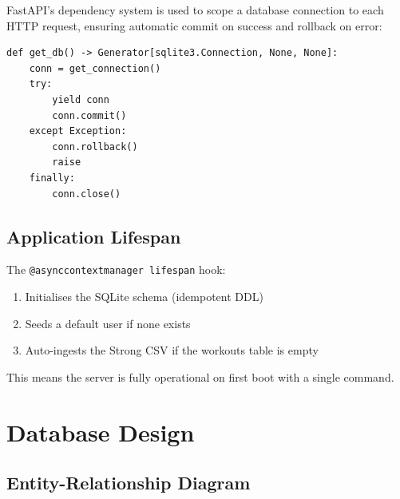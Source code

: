 \documentclass[12pt,a4paper]{report}
\begin{document}
FastAPI's dependency system is used to scope a database connection to each
HTTP request, ensuring automatic commit on success and rollback on error:

\begin{lstlisting}[caption=FastAPI DB dependency]
def get_db() -> Generator[sqlite3.Connection, None, None]:
    conn = get_connection()
    try:
        yield conn
        conn.commit()
    except Exception:
        conn.rollback()
        raise
    finally:
        conn.close()
\end{lstlisting}

\subsection{Application Lifespan}

The \texttt{@asynccontextmanager lifespan} hook:
\begin{enumerate}
  \item Initialises the SQLite schema (idempotent DDL)
  \item Seeds a default user if none exists
  \item Auto-ingests the Strong CSV if the workouts table is empty
\end{enumerate}

This means the server is fully operational on first boot with a single command.

\section{Database Design}

\subsection{Entity-Relationship Diagram}

\begin{center}
\end{center}
\end{document}
